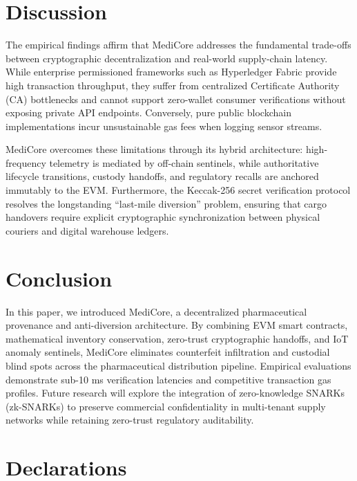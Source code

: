 \documentclass[pdflatex,sn-mathphys-num]{sn-jnl}
\theoremstyle{thmstyleone}
\theoremstyle{thmstyletwo}
\theoremstyle{thmstylethree}
\begin{document}
\section{Discussion}\label{sec11}

The empirical findings affirm that MediCore addresses the fundamental trade-offs between cryptographic decentralization and real-world supply-chain latency. While enterprise permissioned frameworks such as Hyperledger Fabric provide high transaction throughput, they suffer from centralized Certificate Authority (CA) bottlenecks and cannot support zero-wallet consumer verifications without exposing private API endpoints. Conversely, pure public blockchain implementations incur unsustainable gas fees when logging sensor streams.

MediCore overcomes these limitations through its hybrid architecture: high-frequency telemetry is mediated by off-chain sentinels, while authoritative lifecycle transitions, custody handoffs, and regulatory recalls are anchored immutably to the EVM. Furthermore, the Keccak-256 secret verification protocol resolves the longstanding ``last-mile diversion'' problem, ensuring that cargo handovers require explicit cryptographic synchronization between physical couriers and digital warehouse ledgers.

\section{Conclusion}\label{sec12}

In this paper, we introduced MediCore, a decentralized pharmaceutical provenance and anti-diversion architecture. By combining EVM smart contracts, mathematical inventory conservation, zero-trust cryptographic handoffs, and IoT anomaly sentinels, MediCore eliminates counterfeit infiltration and custodial blind spots across the pharmaceutical distribution pipeline. Empirical evaluations demonstrate sub-10 ms verification latencies and competitive transaction gas profiles. Future research will explore the integration of zero-knowledge SNARKs (zk-SNARKs) to preserve commercial confidentiality in multi-tenant supply networks while retaining zero-trust regulatory auditability.

\section*{Declarations}
\end{document}
